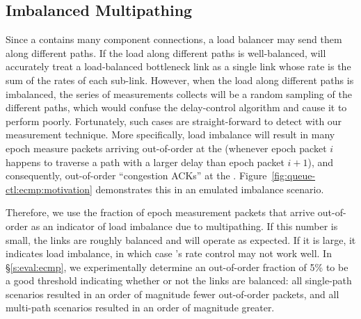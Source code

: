 
\subsection{Imbalanced Multipathing}\label{s:queue-ctl:ecmp}
Since a \bundle contains many component connections, a load balancer may send them along different paths. If the load along different paths is well-balanced, \name will accurately treat a load-balanced bottleneck link as a single link whose rate is the sum of the rates of each sub-link. However, when the load along different paths is imbalanced, the series of measurements \name collects will be a random sampling of the different paths, which would confuse the delay-control algorithm and cause it to perform poorly. Fortunately, such cases are straight-forward to detect with our measurement technique. 
More specifically, load imbalance will result in many epoch measure packets arriving out-of-order at the \outbox (whenever epoch packet $i$ happens to traverse a path with a larger delay than epoch packet $i+1$), and consequently, out-of-order ``congestion ACKs'' at the \inbox.  Figure~\ref{fig:queue-ctl:ecmp:motivation} demonstrates this in an emulated imbalance scenario. 

Therefore, we use the fraction of epoch measurement packets that arrive out-of-order as an indicator of load imbalance due to multipathing.
If this number is small, the links are roughly balanced and \name will operate as expected.
If it is large, it indicates load imbalance, in which case \name's rate control may not work well. 
In \S\ref{s:eval:ecmp}, we experimentally determine an out-of-order fraction of 5\% to be a good threshold indicating whether or not the links are balanced: all single-path scenarios resulted in an order of magnitude fewer out-of-order packets, and all multi-path scenarios resulted in an order of magnitude greater.

